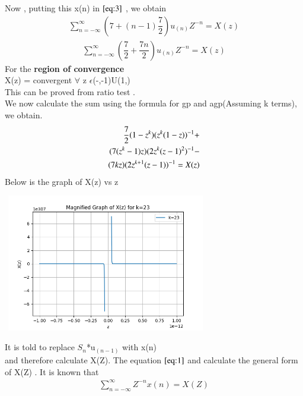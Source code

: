 \documentclass[journal,12pt,twocolumn]{IEEEtran}
\theoremstyle{remark}
\begin{document}
\begin{enumerate}
Now , putting this x(n) in $\eqref{eq:3}$ , we obtain \\
\begin{align}
     \sum_{n=-\infty}^{\infty}(7 + (n-1)\dfrac{7}{2})u_{(n)}Z^{-n} =X(z)
\end{align}
\begin{align}
\sum_{n=-\infty}^{\infty}(\dfrac{7}{2} + \dfrac{7n}{2})u_{(n)}Z^{-n} =X(z)
\end{align}
For the \textbf{region of convergence}\\
X(z) = convergent $\forall$ z $\epsilon$(-\infty,-1)U(1,\infty)
\\

This can be proved from ratio test . \\
We now calculate the sum using the formula for gp and agp(Assuming k terms), we obtain.\\

\begin{align}
   \notag \dfrac{7}{2}(1-z^k)(z^k(1-z))^{-1}+
   \\ \notag(7(z^k-1)z)(2z^k(z-1)^2)^{-1}-\\ (7kz)(2z^{k+1}(z-1))^{-1}=X(z)
\end{align}
Below is the graph of X(z) vs z\\

\graphicspath{ {pictures/} }
\includegraphics[width=9cm, height=6cm]{Figure_2}

It is told to replace $S_n$*u$_{(n-1)}$ with x(n) \\and therefore calculate X(Z). The equation $\eqref{eq:1}$ and calculate the general form of X(Z) .
It is known that\\
\begin{align}
 \sum_{n=-\infty}^{\infty} Z^{-n}x(n) = X(Z)\label{eq:3}
 \end{align}


\end{enumerate}
\end{document}
